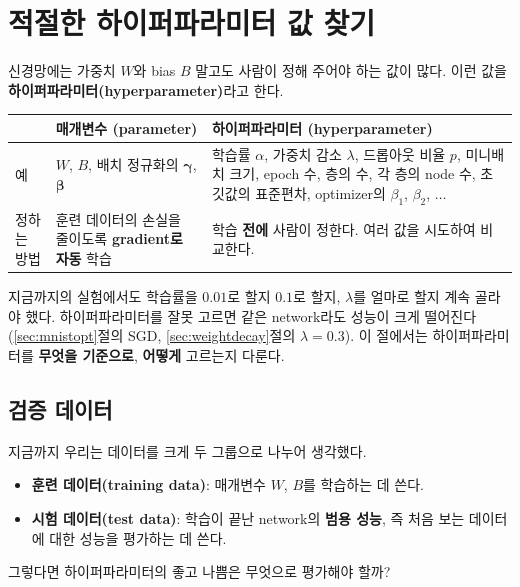 \documentclass[11pt,a4paper]{article}
\begin{document}
\section{적절한 하이퍼파라미터 값 찾기}\label{sec:hyper}

신경망에는 가중치 $W$와 bias $B$ 말고도 사람이 정해 주어야 하는 값이 많다.
이런 값을 \textbf{하이퍼파라미터(hyperparameter)}라고 한다.

\begin{center}
\begin{tabular}{@{}p{}p{}p{}@{}}
\toprule
& 매개변수 (parameter) & 하이퍼파라미터 (hyperparameter) \\
\midrule
예 & $W$, $B$, 배치 정규화의 $\bm\gamma$, $\bm\beta$ &
학습률 $\alpha$, 가중치 감소 $\lambda$, 드롭아웃 비율 $p$, 미니배치 크기, epoch 수, 층의 수, 각 층의 node 수, 초깃값의 표준편차, optimizer의 $\beta_1$, $\beta_2$, $\ldots$ \\[3pt]
정하는 방법 & 훈련 데이터의 손실을 줄이도록 \textbf{gradient로 자동} 학습 & 학습 \textbf{전에} 사람이 정한다. 여러 값을 시도하여 비교한다. \\
\bottomrule
\end{tabular}
\end{center}

지금까지의 실험에서도 학습률을 $0.01$로 할지 $0.1$로 할지, $\lambda$를 얼마로 할지 계속 골라야 했다.
하이퍼파라미터를 잘못 고르면 같은 network라도 성능이 크게 떨어진다 (\ref{sec:mnistopt}절의 SGD, \ref{sec:weightdecay}절의 $\lambda=0.3$).
이 절에서는 하이퍼파라미터를 \textbf{무엇을 기준으로}, \textbf{어떻게} 고르는지 다룬다.

\subsection{검증 데이터}\label{sec:validation}

지금까지 우리는 데이터를 크게 두 그룹으로 나누어 생각했다.
\begin{itemize}[leftmargin=1.8em]
\item \textbf{훈련 데이터(training data)}: 매개변수 $W$, $B$를 학습하는 데 쓴다.
\item \textbf{시험 데이터(test data)}: 학습이 끝난 network의 \textbf{범용 성능}, 즉 처음 보는 데이터에 대한 성능을 평가하는 데 쓴다.
\end{itemize}
그렇다면 하이퍼파라미터의 좋고 나쁨은 무엇으로 평가해야 할까?
\end{document}
